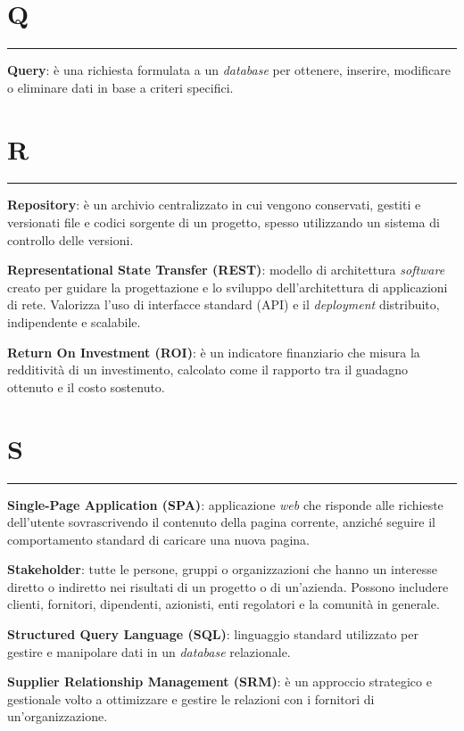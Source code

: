 \section*{Q}
{\color{lightgray}\rule{\textwidth}{0.4pt}} %
\begin{glossaryitemize}
    \item \textbf{Query}: è una richiesta formulata a un \textit{database} per ottenere, inserire, modificare o eliminare dati in base a criteri specifici.
\end{glossaryitemize}

\section*{R}
{\color{lightgray}\rule{\textwidth}{0.4pt}} %
\begin{glossaryitemize}
    \item \textbf{Repository}: è un archivio centralizzato in cui vengono conservati, gestiti e versionati file e codici sorgente di un progetto, spesso utilizzando un sistema di controllo delle versioni.
    \item \textbf{Representational State Transfer (REST)}: modello di architettura \textit{software} creato per guidare la progettazione e lo sviluppo dell’architettura di applicazioni di rete. Valorizza l’uso di interfacce standard (API) e il \textit{deployment} distribuito, indipendente e scalabile.
    \item \textbf{Return On Investment (ROI)}: è un indicatore finanziario che misura la redditività di un investimento, calcolato come il rapporto tra il guadagno ottenuto e il costo sostenuto.
\end{glossaryitemize}

\section*{S}
{\color{lightgray}\rule{\textwidth}{0.4pt}} %
\begin{glossaryitemize}
    \item \textbf{Single-Page Application (SPA)}: applicazione \textit{web} che risponde alle richieste dell’utente sovrascrivendo il contenuto della pagina corrente, anziché seguire il comportamento standard di caricare una nuova pagina.
    \item \textbf{Stakeholder}: tutte le persone, gruppi o organizzazioni che hanno un interesse diretto o indiretto nei risultati di un progetto o di un'azienda. Possono includere clienti, fornitori, dipendenti, azionisti, enti regolatori e la comunità in generale.
    \item \textbf{Structured Query Language (SQL)}: linguaggio standard utilizzato per gestire e manipolare dati in un \textit{database} relazionale.
    \item \textbf{Supplier Relationship Management (SRM)}: è un approccio strategico e gestionale volto a ottimizzare e gestire le relazioni con i fornitori di un'organizzazione.
\end{glossaryitemize}

